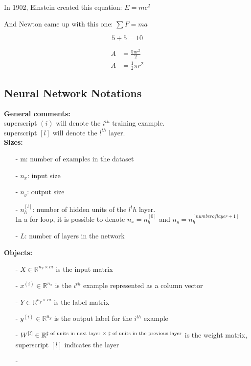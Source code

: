 \documentclass{article}
\begin{document}
    In 1902, Einstein created this equation: $E=mc^2$

    And Newton came up with this one: $\sum F=ma$

    \begin{equation}
        5+5=10
    \end{equation}

    \begin{equation}
        \begin{split}
            A & = \frac{5\pi r^2}{2} \\
            A & = \frac{1}{2} \pi r^2
        \end{split}
    \end{equation}

\newpage
\subsection{Neural Network Notations}

    \textbf{General comments:}\\
    superscript $(i)$ will denote the $i^{th}$ training example. \\
    superscript $[l]$ will denote the $l^{th}$ layer.\\

    \textbf{Sizes:}
    \begin{itemize}
        \item[-]{m: number of examples in the dataset}
        \item[-]{$n_x$: input size}
        \item[-]{$n_y$: output size}
        \item[-]{$n_h^{[l]}$: number of hidden units of the ${l^th}$ layer. \\ In a for loop, it is possible to denote $n_x = n_h^{[0]}$ and $n_y = n_h^{[number of layer+1]}$ }
        \item[-]{$L$: number of layers in the network}
    \end{itemize}

    \textbf{Objects:}
    \begin{itemize}
        \item[-]{$X \in \mathbb{R}^{n_x \times m}$ is the input matrix}
        \item[-]{$x^{(i)} \in \mathbb{R}^{n_x}$ is the $i^{th}$ example represented as a column vector }
        \item[-]{$Y \in \mathbb{R}^{n_y \times m}$ is the label matrix}
        \item[-]{$y^{(i)} \in \mathbb{R}^{n_y}$ is the output label for the $i^{th}$ example}
        \item[-]{$W^{[l]} \in \mathbb{R}\textsuperscript{$\sharp$ of units in next layer $\times$ $\sharp$ of units in the previous layer}$ is the weight matrix, superscript $[l]$ indicates the layer}
        \item[-]{}
    \end{itemize}
\end{document}
